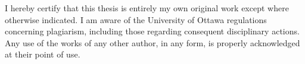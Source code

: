 \noindent
I hereby certify that this thesis is entirely my own original work except where otherwise indicated. I am aware of the University of Ottawa regulations concerning plagiarism, including those regarding consequent disciplinary actions. Any use of the works of any other author, in any form, is properly acknowledged at their point of use.


